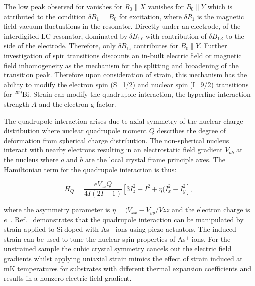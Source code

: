 The low peak observed for  vanishes for $B_{0} \parallel X$ vanishes for $B_{0} \parallel Y$ which is attributed to the condition $\delta B_{1}\perp B_{0}$ for excitation, where $\delta B_{1}$ is the magnetic field vacuum fluctuations in the resonator. Directly under an electrode, of the interdigited LC resonator, dominated by $\delta B_{1Y}$ with contribution of $\delta B_{1Z}$ to the side of the electrode. Therefore, only $\delta B_{1z}$ contributes for $B_{0} \parallel Y$. Further investigation of spin transitions discounts an in-built electric field or magnetic field inhomogeneity as the mechanism for the splitting and broadening of the transition peak. Therefore upon consideration of strain, this mechanism has the ability to modify the electron spin (S=1/2) and nuclear spin (I=9/2) transitions for $^{209}$Bi. Strain can modify the quadrupole interaction, the hyperfine interaction strength $A$ and the electron g-factor.   

The quadrupole interaction arises due to axial symmetry of the nuclear charge distribution where nuclear quadrupole moment $Q$ describes the degree of deformation from spherical charge distribution. The non-spherical nucleus interact with nearby electrons resulting in an electrostatic field gradient $V_{ab}$ at the nucleus where $a$ and $b$ are the local crystal frame principle axes. The Hamiltonian term for the quadrupole interaction is thus:

\begin{equation}
\label{eq:quadropleinteraction}
H_{Q} = \frac{e V_{zz} Q}{4I(2I-1)}\left [3I^{2}_{z}-I^{2}+\eta (I^{2}_{x} - I^{2}_{y} \right ],
\end{equation} 

where the asymmetry parameter is $\eta = (V_{xx}-V_{yy}/V{zz}$ and the electron charge is $e$~\citep{Suits2006}. Ref.~\citep{PhysRevLett.115.057601} demonstrates that the quadrupole interaction can be manipulated by strain applied to Si doped with As$^{+}$ ions using piezo-actuators. The induced strain can be used to tune the nuclear spin properties of As$^{+}$ ions. For the unstrained sample the cubic crystal symmetry cancels out the electric field gradients whilst applying uniaxial strain mimics the effect of strain induced at mK temperatures for substrates with different thermal expansion coefficients and results in a nonzero electric field gradient. 

